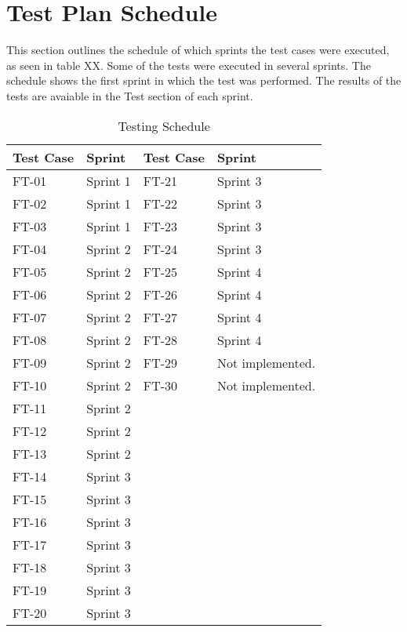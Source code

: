 \section{Test Plan Schedule}

This section outlines the schedule of which sprints the test cases were executed, as seen in table XX. Some of the tests were executed in several sprints. The schedule shows the first sprint in which the test was performed. The results of the tests are avaiable in the Test section of each sprint.


\begin{table}[h]
\centering
\begin{tabular}{| l | l || l | l |}
	\rowcolor{lightgray}
	\hline
	{\bf Test Case} & {\bf Sprint} & {\bf Test Case} & {\bf Sprint} \\ \hline
	FT-01 & Sprint 1 & FT-21 & Sprint 3 \\ \hline
	FT-02 & Sprint 1 & FT-22 & Sprint 3 \\ \hline
	FT-03 & Sprint 1 & FT-23 & Sprint 3 \\ \hline
	FT-04 & Sprint 2 & FT-24 & Sprint 3	\\ \hline
	FT-05 & Sprint 2 & FT-25 & Sprint 4 \\ \hline
	FT-06 & Sprint 2 & FT-26 & Sprint 4 \\ \hline
	FT-07 & Sprint 2 & FT-27 & Sprint 4	\\ \hline
	FT-08 & Sprint 2 & FT-28 & Sprint 4 \\ \hline
	FT-09 & Sprint 2 & FT-29 & Not implemented. \\ \hline
	FT-10 & Sprint 2 & FT-30 & Not implemented. \\ \hline
	FT-11 & Sprint 2 &  & \\ \hline
	FT-12 & Sprint 2 &  & \\ \hline 
	FT-13 & Sprint 2 &  & \\ \hline
	FT-14 & Sprint 3 &  & \\ \hline
	FT-15 & Sprint 3 &  & \\ \hline
	FT-16 & Sprint 3 &  & \\ \hline
	FT-17 & Sprint 3 &  & \\ \hline
	FT-18 & Sprint 3 &  & \\ \hline
	FT-19 & Sprint 3 &  & \\ \hline
	FT-20 & Sprint 3 &  & \\ \hline
\end{tabular}
\caption{Testing Schedule}
\end{table}